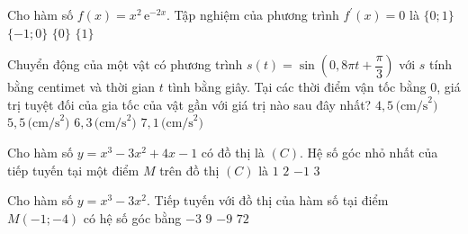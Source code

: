 \begin{ex}%
Cho hàm số $f(x)=x^2\mathrm{\, e}^{-2x}$. Tập nghiệm của phương trình $f^{\prime}(x)=0$ là
	\choice 
	{\True $\{0;1\}$}
	{$\{-1;0\}$}
	{ $\{0\}$}
	{$\{1\}$}
\end{ex}
\begin{ex}%
	Chuyển động của một vật có phương trình $s(t)=\sin \left(0{,}8 \pi t+\dfrac{\pi}{3}\right)$ với $s$ tính bằng centimet và thời gian $t$ tình bằng giây. Tại các thời điểm vận tốc bằng $0$, giá trị tuyệt đối của gia tốc của vật gần với giá trị nào sau đây nhất?
	\choice
	{$4{,}5 \, \text{(cm/s}^2)$}
	{$5{,}5 \, \text{(cm/s}^2)$}
	{$6{,}3 \, \text{(cm/s}^2)$}
	{$7{,}1 \, \text{(cm/s}^2)$}
\end{ex}
\begin{ex}%
	Cho hàm số $y=x^3-3x^2+4x-1$ có đồ thị là $(C).$ Hệ số góc nhỏ nhất của tiếp tuyến tại một điểm $M$ trên đồ thị $(C) $ là
	\choice 
	{\True $1$}
	{$2$}
	{ $-1$}
	{$3$}
\end{ex}
\begin{ex}%
	Cho hàm số $y=x^3-3 x^2$. Tiếp tuyến với đồ thị của hàm số tại điểm $M(-1 ;-4)$ có hệ số góc bằng
	\choice
	{ $-3$}
	{\True $9$ }
	{ $-9$}
	{$72$}
\end{ex}
